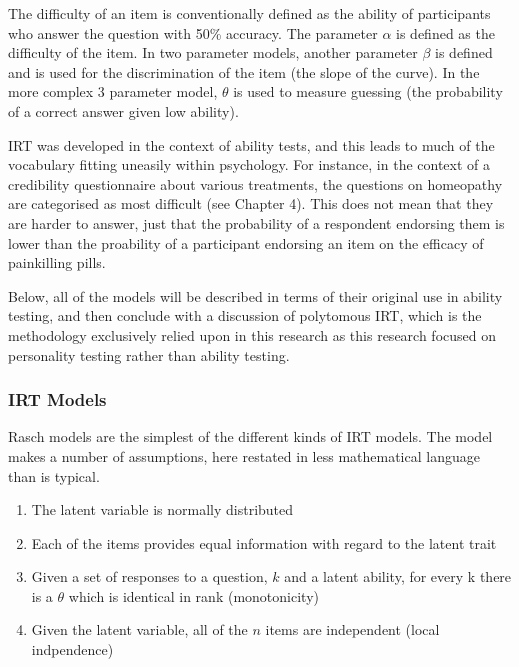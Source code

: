 The difficulty of an item is conventionally defined as the ability of participants who answer the question with 50\% accuracy. The parameter $\alpha$ is defined as the difficulty of the item. In two parameter models, another parameter $\beta$ is defined and is used for the discrimination of the item (the slope of the curve). In the more complex 3 parameter model, $\theta$ is used to measure guessing (the probability of a correct answer given low ability)\cite{van1997handbook}.

IRT was developed in the context of ability tests, and this leads to much of the vocabulary fitting uneasily within psychology. For instance, in the context of a credibility questionnaire about various treatments, the questions on homeopathy are categorised as most difficult (see Chapter 4). This does not mean that they are harder to answer, just that the probability of a respondent endorsing them is lower than the proability of a participant endorsing an item on the efficacy of painkilling pills.

Below, all of the models will be described in terms of their original use in ability testing, and then conclude with a discussion of polytomous IRT, which is the methodology exclusively relied upon in this research as this research focused on personality testing rather than ability testing.



\subsubsection{IRT Models}

Rasch models are the simplest of the different kinds of IRT models. The model makes a number of assumptions, here restated in less mathematical language than is typical\cite{fischer1995rasch}.

\begin{enumerate}
\item The latent variable is normally distributed
\item Each of the items provides equal information with regard to the latent trait
\item Given a set of responses to a question, $k$ and a latent ability, for every k there is a $\theta$ which is identical in rank (monotonicity)
\item Given the latent variable, all of the $n$ items are independent (local indpendence)
\end{enumerate}

